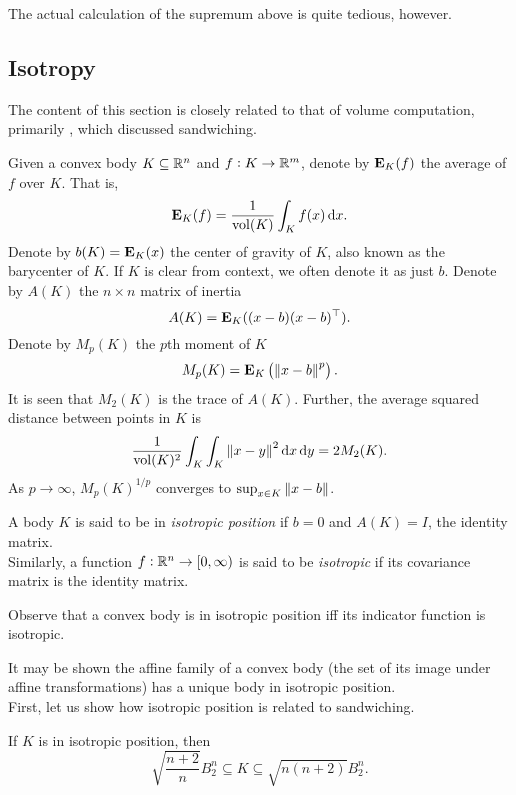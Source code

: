\documentclass{article}
\begin{document}
		The actual calculation of the supremum above is quite tedious, however.


	\subsection{Isotropy}

		The content of this section is closely related to that of volume computation, primarily , which discussed sandwiching.

		Given a convex body $K\subseteq\mathbb{R}^n$ and $f:K\to\mathbb{R}^m$, denote by $\textbf{E}_K(f)$ the average of $f$ over $K$. That is,
		\[ \textbf{E}_K(f) = \frac{1}{\operatorname{vol}(K)} \int_{K} f(x)\operatorname{d}\!{x}. \]
		Denote by $b(K)=\textbf{E}_K(x)$ the center of gravity of $K$, also known as the barycenter of $K$. If $K$ is clear from context, we often denote it as just $b$. Denote by $A(K)$ the $n\times n$ matrix of inertia
		\[ A(K) = \textbf{E}_K((x-b)(x-b)^\top). \]
		Denote by $M_p(K)$ the $p$th moment of $K$
		\[ M_p(K) = \textbf{E}_K\left(\left\lVert x-b\right\rVert^p\right). \]
		It is seen that $M_2(K)$ is the trace of $A(K)$. Further, the average squared distance between points in $K$ is
		\[ \frac{1}{\operatorname{vol}(K)^2} \int_K \int_K \left\lVert x-y\right\rVert^2\operatorname{d}\!{x}\operatorname{d}\!{y} = 2M_2(K). \]
		As $p\to\infty$, $M_p(K)^{1/p}$ converges to $\sup_{x\in K} \left\lVert x-b\right\rVert$.

		\begin{fdef}[Isotropic]
			A body $K$ is said to be in \textit{isotropic position} if $b=0$ and $A(K)=I$, the identity matrix.\footnotemark\\
			Similarly, a function $f:\mathbb{R}^n\to[0,\infty)$ is said to be \textit{isotropic} if its covariance matrix is the identity matrix.
		\end{fdef}

		Observe that a convex body is in isotropic position iff its indicator function is isotropic.

		It may be shown the affine family of a convex body (the set of its image under affine transformations) has a unique body in isotropic position.\\
		First, let us show how isotropic position is related to sandwiching.

		\begin{ftheo}
			If $K$ is in isotropic position, then
			\[ \sqrt{\frac{n+2}{n}} B_2^n \subseteq K \subseteq \sqrt{n(n+2)}B_2^n. \]
		\end{ftheo}
\end{document}
